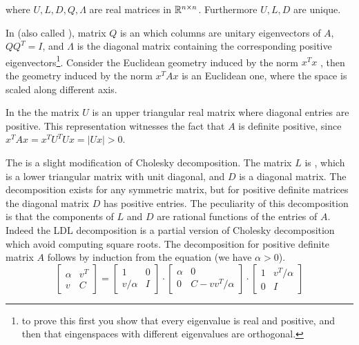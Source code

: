 \documentclass[a4paper,twoside,justified]{tufte-handout}
\begin{document}
where $ U,L,D,Q,\Lambda $ are real matrices in $ \mathbb{R}^{n\times n}
$. Furthermore $ U,L,D $ are unique.

In  (also called
), matrix $ Q $ is an
 which columns are unitary
eigenvectors of $ A $, \ie $ QQ^{T} = I$, and $ \Lambda $ is the
diagonal matrix containing the corresponding positive
eigenvectors\footnote{to prove this first you show that every
  eigenvalue is real and positive, and then that eingenspaces with
  different eigenvalues are orthogonal.}.
%
Consider the Euclidean geometry induced by the norm $ x^{T}x $ , then
the geometry induced by the norm $ x^{T}A x$ is an Euclidean one,
where the space is scaled along different axis.

In the  the matrix $ U $ is an
upper triangular real matrix where diagonal entries are positive. This
representation witnesses the fact that $ A $ is definite positive,
since $ x^{T}A x = x^{T}U^{T}U x = |Ux| > 0 $.

The  is a slight modification of
Cholesky decomposition. The matrix $ L$ is , which is a lower triangular matrix with unit diagonal,
and $ D $ is a diagonal matrix. The decomposition exists for any
symmetric matrix, but for positive definite matrices the diagonal
matrix $D$ has positive entries. The peculiarity of this
decomposition is that the components of $ L $ and $ D $ are rational
functions of the entries of $ A $. Indeed the LDL decomposition is a
partial version of Cholesky decomposition which avoid computing square
roots. The decomposition for positive definite matrix $A$ follows by
induction from the equation (we have $\alpha>0$).
\begin{equation}
  \begin{bmatrix}
    \alpha & v^{T} \\
    v & C
  \end{bmatrix} =
  \begin{bmatrix}
    1 & 0 \\
    v/\alpha & I
  \end{bmatrix} \cdot
  \begin{bmatrix}
    \alpha & 0 \\
    0 & C -vv^{T}/\alpha
  \end{bmatrix} \cdot
  \begin{bmatrix}
    1 & v^{T}/\alpha \\
    0 & I
  \end{bmatrix} 
\end{equation}
\end{document}
